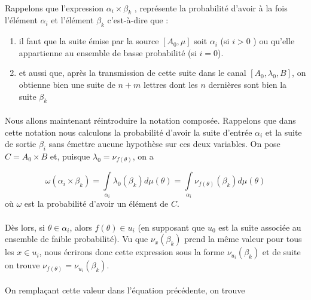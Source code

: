 	\paragraph{}
	Rappelons que l'expression $\alpha_i \times \beta_k$ , représente 
	la probabilité d'avoir à la fois l'élément $\alpha_i$ et 
	l'élément $\beta_k$ c'est-à-dire que :
	\begin{enumerate}
		\item il faut que la suite émise par la source $[A_0,\mu]$ soit 
			$\alpha_i$ (si $i >0$ ) ou qu'elle appartienne au ensemble de 
			basse probabilité (si $i=0$).
		\item et aussi que, après la transmission de cette suite dans 
			le canal $[A_0,\lambda_0,B]$, on obtienne bien une suite 
			de $n+m$ lettres dont les $n$ 
			dernières sont bien la suite $\beta_k$
	\end{enumerate} 
	
	\paragraph{}
	Nous allons maintenant réintroduire la notation composée. Rappelons que
	dans cette notation nous calculons la probabilité d'avoir la suite
	d'entrée $\alpha_i$ et la suite de sortie $\beta_i$ sans émettre aucune
	hypothèse sur ces deux variables. On pose $C = A_0 \times B$ et,
	puisque $\lambda_0 = \nu_{f(\theta)}$, on a
	
	
	\[
		\omega(\alpha_i\times\beta_k)=
		\int\limits_{\alpha_i}\lambda_0(\beta_k)d\mu(\theta)=
		\int\limits_{\alpha_i}\nu_{f(\theta)}(\beta_k)d\mu(\theta)
	\]
	où $\omega$ est la probabilité d'avoir un élément de $C$.
	
	\paragraph{}
	Dès lors, si $\theta \in \alpha_i$, alors $f(\theta) \in u_i$ (en supposant
	que $u_0$ est la suite associée au ensemble de faible probabilité).
	Vu que $\nu_x(\beta_k)$ prend la même valeur pour tous les $x \in u_i$,
	nous écrirons donc cette expression sous la forme $\nu_{u_i}(\beta_k)$ et
	de suite on trouve $\nu_{f(\theta)}=\nu_{u_i}(\beta_k)$.
	
	\paragraph{}
	On remplaçant cette valeur dans l'équation précédente, on trouve
	
